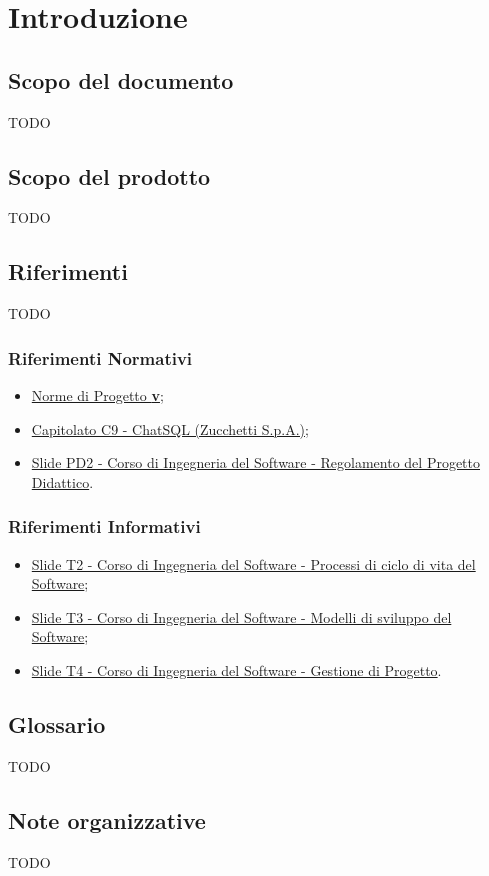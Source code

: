 \section{Introduzione}

\subsection{Scopo del documento}
TODO
\subsection{Scopo del prodotto}
TODO
\subsection{Riferimenti}
TODO
\subsubsection{Riferimenti Normativi}
\begin{itemize}
  \item \href{https://github.com/Argo-swe/Argo-swe.github.io/tree/main/2 - RTB}{Norme di Progetto \textbf{v\VersioneNP}};
  \item \href{https://www.math.unipd.it/~tullio/IS-1/2023/Progetto/C9.pdf}{Capitolato C9 - ChatSQL (Zucchetti S.p.A.)};
  \item \href{https://www.math.unipd.it/~tullio/IS-1/2023/Dispense/PD2.pdf}{Slide PD2 - Corso di Ingegneria del Software - Regolamento del Progetto Didattico}.
\end{itemize}

\subsubsection{Riferimenti Informativi}
\begin{itemize}
  \item \href{https://www.math.unipd.it/~tullio/IS-1/2023/Dispense/T2.pdf}{Slide T2 - Corso di Ingegneria del Software - Processi di ciclo di vita del Software};
  \item \href{https://www.math.unipd.it/~tullio/IS-1/2023/Dispense/T3.pdf}{Slide T3 - Corso di Ingegneria del Software - Modelli di sviluppo del Software};
  \item \href{https://www.math.unipd.it/~tullio/IS-1/2023/Dispense/T4.pdf}{Slide T4 - Corso di Ingegneria del Software - Gestione di Progetto}.
\end{itemize}

\subsection{Glossario} 
TODO
\subsection{Note organizzative}
TODO